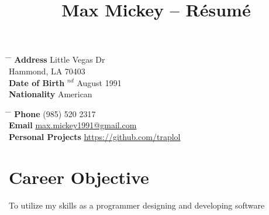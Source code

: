 \documentclass[9pt]{article} %
\begin{document}

\title{Max Mickey -- Résumé} %


\parbox{0.5\textwidth}{ %
\begin{tabbing} %
\hspace{3cm} \= \hspace{4cm} \= \kill %
{\bf Address}  Little Vegas Dr\\ %
\> Hammond, LA 70403 \\ %
{\bf Date of Birth} $^{nd}$ August 1991 \\ %
{\bf Nationality} \> American %
\end{tabbing}}
\hfill %
\parbox{0.5\textwidth}{ %
\begin{tabbing} %
\hspace{3cm} \= \hspace{4cm} \= \kill %
{\bf Phone} \> (985) 520 2317 \\ %
{\bf Email} \> \href{mailto:max.mickey1991@gmail.com}{max.mickey1991@gmail.com} \\ %
{\bf Personal Projects} \> \href{https://github.com/traplol}{https://github.com/traplol}
\end{tabbing}}


\section{Career Objective}

To utilize my skills as a programmer designing and developing software

\end{document}
